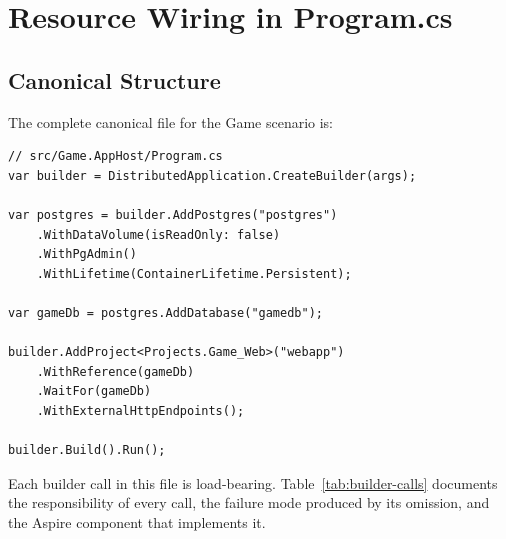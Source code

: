 \section{Resource Wiring in Program.cs}
\label{sec:wiring}

\subsection{Canonical Structure}

The complete canonical file for the Game scenario is:

\begin{lstlisting}[language={[Sharp]C}]
// src/Game.AppHost/Program.cs
var builder = DistributedApplication.CreateBuilder(args);

var postgres = builder.AddPostgres("postgres")
    .WithDataVolume(isReadOnly: false)
    .WithPgAdmin()
    .WithLifetime(ContainerLifetime.Persistent);

var gameDb = postgres.AddDatabase("gamedb");

builder.AddProject<Projects.Game_Web>("webapp")
    .WithReference(gameDb)
    .WaitFor(gameDb)
    .WithExternalHttpEndpoints();

builder.Build().Run();
\end{lstlisting}

Each builder call in this file is load-bearing. Table~\ref{tab:builder-calls} documents the responsibility of every call, the failure mode produced by its omission, and the Aspire component that implements it.

